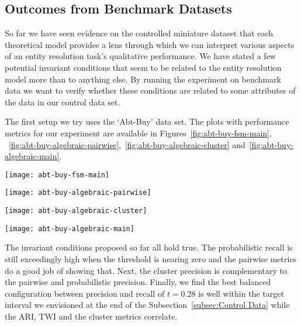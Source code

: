 \subsection{Outcomes from Benchmark Datasets}\label{subsec:Benchmark Datasets}

So far we have seen evidence on the controlled miniature dataset that each
theoretical model provides a lens through which we can interpret various aspects
of an entity resolution task's qualitative performance.
We have stated a few potential invariant conditions that seem to be related to
the entity resolution model more than to anything else.
By running the experiment on benchmark data we want to verify whether these
conditions are related to some attributes of the data in our control data set.

The first setup we try uses the `Abt-Buy' data set.
The plots with performance metrics for our experiment are available in Figures~\ref{fig:abt-buy-fsm-main},
~\ref{fig:abt-buy-algebraic-pairwise},~\ref{fig:abt-buy-algebraic-cluster}
and~\ref{fig:abt-buy-algebraic-main}.

\begin{figure*}[htbp]
    \begin{minipage}{0.24\textwidth}
        \centering
        \texttt{[image: abt-buy-fsm-main]}
        \caption{Abt-Buy statistical metrics.}\label{fig:abt-buy-fsm-main}
    \end{minipage}
    \begin{minipage}{0.24\textwidth}
        \centering
        \texttt{[image: abt-buy-algebraic-pairwise]}
        \caption{Abt-Buy pairwise metrics.}\label{fig:abt-buy-algebraic-pairwise}
    \end{minipage}
    \begin{minipage}{0.24\textwidth}
        \centering
        \texttt{[image: abt-buy-algebraic-cluster]}
        \caption{Abt-Buy cluster metrics.}\label{fig:abt-buy-algebraic-cluster}
    \end{minipage}
    \begin{minipage}{0.24\textwidth}
        \centering
        \texttt{[image: abt-buy-algebraic-main]}
        \caption{Abt-Buy clustering indexes.}\label{fig:abt-buy-algebraic-main}
    \end{minipage}
\end{figure*}\label{abt-buy}

The invariant conditions proposed so far all hold true.
The probabilistic recall is still exceedingly high when the threshold is nearing zero and the
pairwise metrics do a good job of showing that.
Next, the cluster precision is complementary to the pairwise and probabilistic
precision.
Finally, we find the best balanced configuration between precision and recall of
$t=0.28$ is well within the target interval we envisioned at the end of the
Subsection~\ref{subsec:Control Data} while the ARI, TWI and the cluster metrics correlate.

